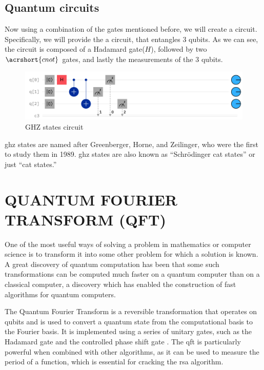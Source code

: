 \documentclass[inscr,ack,preface]{diphdthesis}
\begin{document}
\section{Quantum circuits}

Now using a combination of the gates mentioned before, we will create a circuit. Specifically, we will provide the a circuit, that entangles 3 \acrshort{qubit}s. As we can see, the circuit is composed of a Hadamard gate($H$), followed by two $\acrshort{cnot}$ gates, and lastly the measurements of the 3 \acrshort{qubit}s. \cite{ibm}
\begin{figure}[ht]
    \includegraphics[width=1\textwidth]{ghz.png}
    \caption{GHZ states circuit}
    \label{fig:enter-label}
\end{figure}

\acrshort{ghz} states are named after Greenberger, Horne, and Zeilinger, who were the first to study them in 1989. \acrshort{ghz} states are also known as “Schrödinger cat states” or just “cat states.” \cite{ghz_ibm}

\chapter{QUANTUM FOURIER TRANSFORM (QFT)}

One of the most useful ways of solving a problem in mathematics or computer science is to transform it into some other problem for which a solution is known.  A great discovery of quantum computation has been that some such transformations can be computed much faster on a quantum computer than on a classical computer, a discovery which has enabled the construction of fast algorithms for quantum computers.

The Quantum Fourier Transform is a reversible transformation that operates on \acrshort{qubit}s and is used to convert a quantum state from the computational basis to the Fourier basis. It is implemented using a series of unitary gates, such as the Hadamard gate and the controlled phase shift gate \cite{niel}. The \acrshort{qft} is particularly powerful when combined with other algorithms, as it can be used to measure the period of a function, which is essential for cracking the \acrshort{rsa} algorithm.
\end{document}
